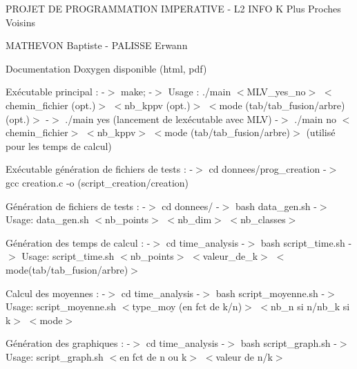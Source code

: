 PROJET DE PROGRAMMATION IMPERATIVE -\/ L2 INFO K Plus Proches Voisins

MATHEVON Baptiste -\/ PALISSE Erwann

Documentation Doxygen disponible (html, pdf)

Exécutable principal \+: -\/$>$ make; -\/$>$ Usage \+: ./main $<$\+MLV\+\_\+yes\+\_\+no$>$ $<$chemin\+\_\+fichier (opt.)$>$ $<$nb\+\_\+kppv (opt.)$>$ $<$mode (tab/tab\+\_\+fusion/arbre) (opt.)$>$ -\/$>$ ./main yes (lancement de l\textquotesingle{}exécutable avec MLV) -\/$>$ ./main no $<$chemin\+\_\+fichier$>$ $<$nb\+\_\+kppv$>$ $<$mode (tab/tab\+\_\+fusion/arbre)$>$ (utilisé pour les temps de calcul)

Exécutable génération de fichiers de tests \+: -\/$>$ cd donnees/prog\+\_\+creation -\/$>$ gcc creation.\+c -\/o (script\+\_\+creation/creation)

Génération de fichiers de tests \+: -\/$>$ cd donnees/ -\/$>$ bash data\+\_\+gen.\+sh -\/$>$ Usage\+: data\+\_\+gen.\+sh $<$nb\+\_\+points$>$ $<$nb\+\_\+dim$>$ $<$nb\+\_\+classes$>$

Génération des temps de calcul \+: -\/$>$ cd time\+\_\+analysis -\/$>$ bash script\+\_\+time.\+sh -\/$>$ Usage\+: script\+\_\+time.\+sh $<$nb\+\_\+points$>$ $<$valeur\+\_\+de\+\_\+k$>$ $<$mode(tab/tab\+\_\+fusion/arbre)$>$

Calcul des moyennes \+: -\/$>$ cd time\+\_\+analysis -\/$>$ bash script\+\_\+moyenne.\+sh -\/$>$ Usage\+: script\+\_\+moyenne.\+sh $<$type\+\_\+moy (en fct de k/n)$>$ $<$nb\+\_\+n si n/nb\+\_\+k si k$>$ $<$mode$>$

Génération des graphiques \+: -\/$>$ cd time\+\_\+analysis -\/$>$ bash script\+\_\+graph.\+sh -\/$>$ Usage\+: script\+\_\+graph.\+sh $<$en fct de n ou k$>$ $<$valeur de n/k$>$ 